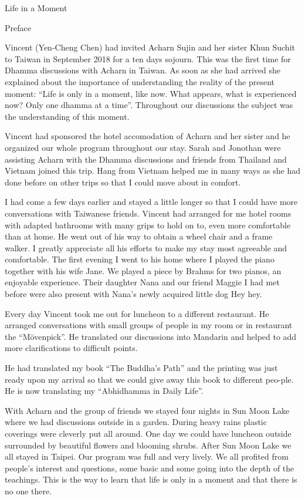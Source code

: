 \documentclass[10pt,a4paper,final]{article}
\begin{document}
Life in a Moment

Preface

Vincent (Yen-Cheng Chen) had invited Acharn Sujin and her
sister Khun Suchit to Taiwan in September 2018 for a ten days sojourn.
This was the first time for Dhamma discussions with Acharn in Taiwan. As
soon as she had arrived she explained about the importance of
understanding the reality of the present moment: ``Life is only in a
moment, like now. What appears, what is experienced now? Only one dhamma
at a time''. Throughout our discussions the subject was the
understanding of this moment. 

Vincent had sponsored the hotel accomodation of Acharn and
her sister and he organized our whole program throughout our stay. Sarah
and Jonothan were assisting Acharn with the Dhamma discussions and
friends from Thailand and Vietnam joined this trip. Hang from Vietnam
helped me in many ways as she had done before on other trips so that I
could move about in comfort. 

I had come a few days earlier and stayed a little longer so
that I could have more conversations with Taiwanese friends. Vincent had
arranged for me hotel rooms with adapted bathrooms with many grips to
hold on to, even more comfortable than at home. He went out of his way
to obtain a wheel chair and a frame walker. I greatly appreciate all his
efforts to make my stay most agreeable and comfortable. The first
evening I went to his home where I played the piano together with his
wife Jane. We played a piece by Brahms for two pianos, an enjoyable
experience. Their daughter Nana and our friend Maggie I had met before
were also present with Nana's newly acquired little dog Hey hey. 

Every day Vincent took me out for luncheon to a different
restaurant. He arranged conversations with small groups of people in my
room or in restaurant the ``Mövenpick''. He translated our discussions
into Mandarin and helped to add more clarifications to difficult
points.

He had translated my book ``The Buddha's Path'' and the
printing was just ready upon my arrival so that we could give away this
book to different peo-ple. He is now translating my ``Abhidhamma in
Daily Life''. 

With Acharn and the group of friends we stayed four nights in
Sun Moon Lake where we had discussions outside in a garden. During heavy
rains plastic coverings were cleverly put all around. One day we could
have luncheon outside surrounded by beautiful flowers and blooming
shrubs. After Sun Moon Lake we all stayed in Taipei. Our program was
full and very lively. We all profited from people's interest and
questions, some basic and some going into the depth of the teachings.
This is the way to learn that life is only in a moment and that there is
no one there.
\end{document}
